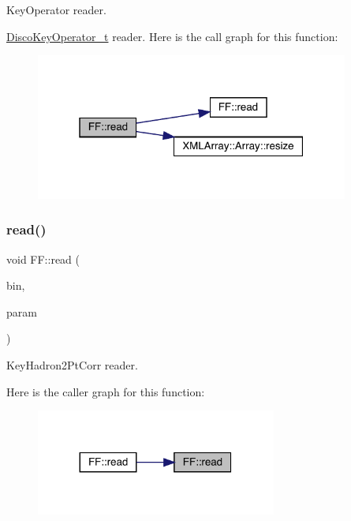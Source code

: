 Key\+Operator reader. 

\mbox{\hyperlink{structFF_1_1DiscoKeyOperator__t}{Disco\+Key\+Operator\+\_\+t}} reader. Here is the call graph for this function\+:\nopagebreak
\begin{figure}[H]
\begin{center}
\leavevmode
\includegraphics[width=292pt]{d5/da6/namespaceFF_a90d854af01e30d52191dff4341fcd4ad_cgraph}
\end{center}
\end{figure}
\mbox{\label{namespaceFF_a7b6f77b4f2cff40fc56befd4b4c64b7d}} 
\subsubsection{\texorpdfstring{read()}{read()}\hspace{0.1cm}{\footnotesize\ttfamily [12/14]}}
{\footnotesize\ttfamily void F\+F\+::read (\begin{DoxyParamCaption}\item[{\mbox{\hyperlink{classADATIO_1_1BinaryReader}{Binary\+Reader}} \&}]{bin,  }\item[{\mbox{\hyperlink{structFF_1_1KeyHadron2PtCorr__t}{Key\+Hadron2\+Pt\+Corr\+\_\+t}} \&}]{param }\end{DoxyParamCaption})}



Key\+Hadron2\+Pt\+Corr reader. 

Here is the caller graph for this function\+:\nopagebreak
\begin{figure}[H]
\begin{center}
\leavevmode
\includegraphics[width=224pt]{d5/da6/namespaceFF_a7b6f77b4f2cff40fc56befd4b4c64b7d_icgraph}
\end{center}
\end{figure}
\mbox{\label{namespaceFF_adbbf0211a7578841555412497b4f18c4}} 
